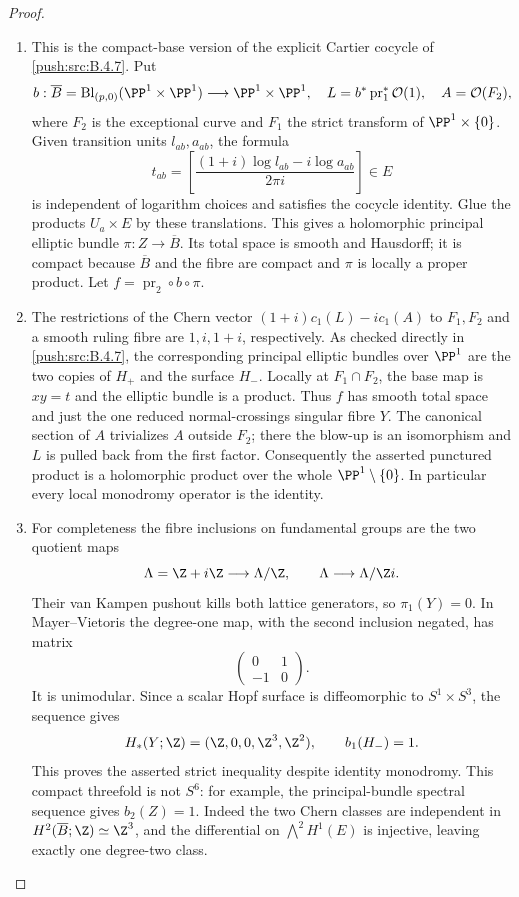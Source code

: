 \begin{proof}
\begin{enumerate}[label=\arabic*.,leftmargin=*]
\item This is the compact-base version of the explicit Cartier cocycle
of \ref{push:src:B.4.7}.
Put
\[
 b:\overline B=\operatorname{Bl}_{(p,0)}(\PP^1\times\PP^1)
      \longrightarrow\PP^1\times\PP^1,
 \quad L=b^*\operatorname{pr}_1^*\mathcal O(1),
 \quad A=\mathcal O(F_2),
\]
where $F_2$ is the exceptional curve and $F_1$ the strict transform
of $\PP^1\times\{0\}$.  Given transition units $l_{ab},a_{ab}$,
the formula
\[
 t_{ab}=\left[
 \frac{(1+i)\log l_{ab}-i\log a_{ab}}{2\pi i}
 \right]\in E
\]
is independent of logarithm choices and satisfies the cocycle
identity.  Glue the products $U_a\times E$ by these translations.
This gives a holomorphic principal elliptic bundle
$\pi:Z\to\overline B$.  Its total space is smooth and Hausdorff;
it is compact because $\overline B$ and the fibre are compact and
$\pi$ is locally a proper product.  Let
$f=\operatorname{pr}_2\circ b\circ\pi$.

\item The restrictions of the Chern vector
$(1+i)c_1(L)-i c_1(A)$ to $F_1,F_2$ and a smooth ruling fibre
are $1,i,1+i$, respectively.  As checked directly in \ref{push:src:B.4.7},
the corresponding principal elliptic bundles over $\PP^1$
are the two copies of $H_+$ and the surface $H_-$.  Locally
at $F_1\cap F_2$, the base map is $xy=t$ and the elliptic
bundle is a product.  Thus $f$ has smooth total space and just
the one reduced normal-crossings singular fibre $Y$.
The canonical section of $A$ trivializes $A$ outside $F_2$;
there the blow-up is an isomorphism and $L$ is pulled back
from the first factor.  Consequently the asserted punctured
product is a holomorphic product over the whole
$\PP^1\setminus\{0\}$.  In particular every local monodromy
operator is the identity.

\item For completeness the fibre inclusions on fundamental groups
are the two quotient maps
\[
 \Lambda=\Z+i\Z\longrightarrow\Lambda/\Z,
 \qquad
 \Lambda\longrightarrow\Lambda/\Z i.
\]
Their van Kampen pushout kills both lattice generators, so
$\pi_1(Y)=0$.  In Mayer--Vietoris the degree-one map, with
the second inclusion negated, has matrix
\[
 \begin{pmatrix}0&1\\-1&0\end{pmatrix}.
\]
It is unimodular.  Since a scalar Hopf surface is diffeomorphic
to $S^1\times S^3$, the sequence gives
\[
 H_*(Y;\Z)=(\Z,0,0,\Z^3,\Z^2),\qquad b_1(H_-)=1.
\]
This proves the asserted strict inequality despite identity
monodromy.  This compact threefold is not $S^6$: for example,
the principal-bundle spectral sequence gives $b_2(Z)=1$.
Indeed the two Chern classes are independent in
$H^2(\overline B;\Z)\simeq\Z^3$, and the differential on
$\bigwedge^2H^1(E)$ is injective, leaving exactly one
degree-two class.
\end{enumerate}
\end{proof}

